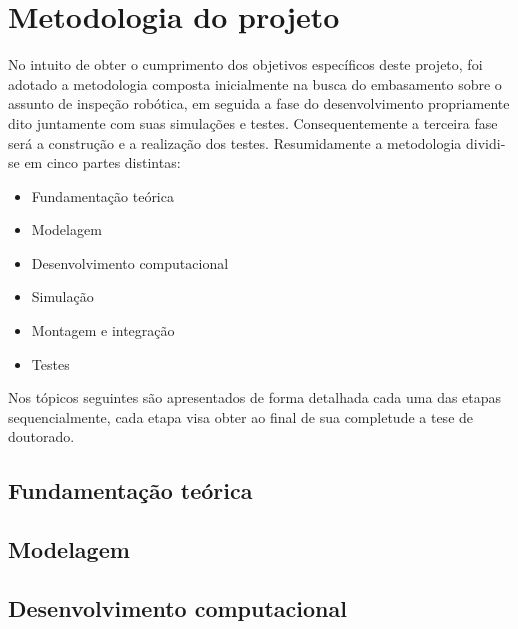 \chapter{Metodologia do projeto}
No intuito de obter o cumprimento dos objetivos específicos deste projeto, foi adotado a metodologia composta inicialmente na busca do embasamento sobre o assunto de inspeção robótica, em seguida a fase do desenvolvimento propriamente dito juntamente com suas simulações e testes. Consequentemente a terceira fase será a construção e a realização dos testes. Resumidamente a metodologia dividi-se em cinco partes distintas:
\begin{itemize}
\item Fundamentação teórica
\item Modelagem
\item Desenvolvimento computacional
\item Simulação
\item Montagem e integração
\item Testes
\end{itemize}
Nos tópicos seguintes são apresentados de forma detalhada cada uma das etapas sequencialmente, cada etapa visa obter ao final de sua completude a tese de doutorado.

\setcounter{equation}{0}
\section{Fundamentação teórica}


\section{Modelagem}

\section{Desenvolvimento computacional}


